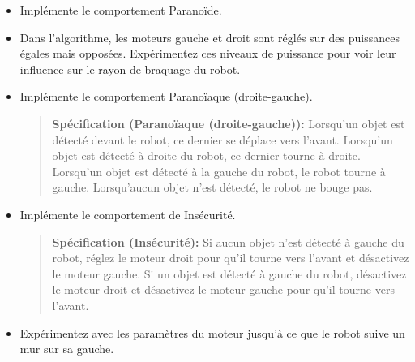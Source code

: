 \begin{framed}
\begin{itemize}
\item Implémente le comportement Paranoïde.
\item Dans l'algorithme, les moteurs gauche et droit sont réglés sur des puissances égales mais opposées. Expérimentez ces niveaux de puissance pour voir leur influence sur le rayon de braquage du robot.
\end{itemize}
\end{framed}

\begin{framed}
\begin{itemize}
\item Implémente le comportement Paranoïaque (droite-gauche).
\begin{quote}
\normalsize\noindent\textbf{Spécification (Paranoïaque (droite-gauche)):} Lorsqu'un objet est détecté devant le robot, ce dernier se déplace vers l'avant. Lorsqu'un objet est détecté à droite du robot, ce dernier tourne à droite. Lorsqu'un objet est détecté à la gauche du robot, le robot tourne à gauche. Lorsqu'aucun objet n'est détecté, le robot ne bouge pas.
\end{quote}
\end{itemize}
\end{framed}

\begin{framed}
\begin{itemize}
\item Implémente le comportement de Insécurité.
\begin{quote}
\normalsize\noindent\textbf{Spécification (Insécurité):} Si aucun objet n'est détecté à gauche du robot, réglez le moteur droit pour qu'il tourne vers l'avant et désactivez le moteur gauche. Si un objet est détecté à gauche du robot, désactivez le moteur droit et désactivez le moteur gauche pour qu'il tourne vers l'avant.
\end{quote}
\item Expérimentez avec les paramètres du moteur jusqu'à ce que le robot suive un mur sur sa gauche.
\end{itemize}
\end{framed}

